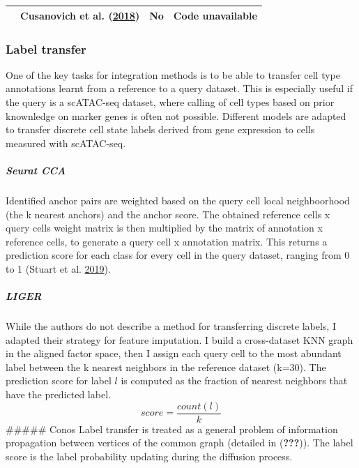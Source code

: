 \documentclass[]{article}
\let\oldsubparagraph\subparagraph
\renewcommand{\subparagraph}[1]{\oldsubparagraph{#1}\mbox{}}
\begin{document}
\begin{longtable}[]{@{}llcc@{}}
\begin{minipage}[t]{0.17\columnwidth}
\end{minipage} & \begin{minipage}[t]{0.14\columnwidth}\raggedright
Cusanovich et al.
(\protect\hyperlink{ref-cusanovichSingleCellAtlasVivo2018a}{2018})\strut
\end{minipage} & \begin{minipage}[t]{0.30\columnwidth}\centering
No\strut
\end{minipage} & \begin{minipage}[t]{0.28\columnwidth}\centering
Code unavailable\strut
\end{minipage}\tabularnewline
\bottomrule
\end{longtable}

\hypertarget{transfer-label}{%
\subsubsection{Label transfer}\label{transfer-label}}

One of the key tasks for integration methods is to be able to transfer
cell type annotations learnt from a reference to a query dataset. This
is especially useful if the query is a scATAC-seq dataset, where calling
of cell types based on prior knownledge on marker genes is often not
possible. Different models are adapted to transfer discrete cell state
labels derived from gene expression to cells measured with scATAC-seq.

\hypertarget{seurat-cca}{%
\subparagraph{Seurat CCA}\label{seurat-cca}}

Identified anchor pairs are weighted based on the query cell local
neighboorhood (the k nearest anchors) and the anchor score. The obtained
reference cells x query cells weight matrix is then multiplied by the
matrix of annotation x reference cells, to generate a query cell x
annotation matrix. This returns a prediction score for each class for
every cell in the query dataset, ranging from 0 to 1 (Stuart et al.
\protect\hyperlink{ref-stuartComprehensiveIntegrationSingleCell2019a}{2019}).

\hypertarget{liger}{%
\subparagraph{LIGER}\label{liger}}

While the authors do not describe a method for transferring discrete
labels, I adapted their strategy for feature imputation. I build a
cross-dataset KNN graph in the aligned factor space, then I assign each
query cell to the most abundant label between the k nearest neighbors in
the reference dataset (k=30). The prediction score for label \(l\) is
computed as the fraction of nearest neighbors that have the predicted
label. \[
score = \frac{count(l)}{k}
\] \#\#\#\#\# Conos Label transfer is treated as a general problem of
information propagation between vertices of the common graph (detailed
in ({\textbf{???}})). The label score is the label probability updating
during the diffusion process.
\end{document}

